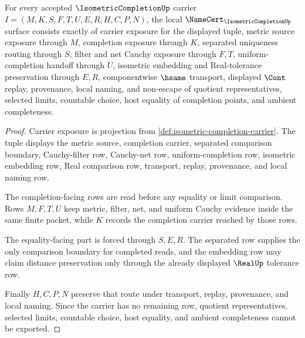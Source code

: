 \begin{theorem}
\label{thm:isometric-completion-namecert-obligations}
For every accepted $\IsometricCompletionUp$ carrier $I=(M,K,S,F,T,U,E,R,H,C,P,N)$, the local $\NameCert_{\IsometricCompletionUp}$ surface consists exactly of carrier exposure for the displayed tuple, metric source exposure through $M$, completion exposure through $K$, separated uniqueness routing through $S$, filter and net Cauchy exposure through $F,T$, uniform-completion handoff through $U$, isometric embedding and Real-tolerance preservation through $E,R$, componentwise $\hsame$ transport, displayed $\Cont$ replay, provenance, local naming, and non-escape of quotient representatives, selected limits, countable choice, host equality of completion points, and ambient completeness.
\end{theorem}
\begin{proof}
Carrier exposure is projection from \autoref{def:isometric-completion-carrier}. The tuple displays the metric source, completion carrier, separated comparison boundary, Cauchy-filter row, Cauchy-net row, uniform-completion row, isometric embedding row, Real comparison row, transport, replay, provenance, and local naming row.

The completion-facing rows are read before any equality or limit comparison. Rows $M,F,T,U$ keep metric, filter, net, and uniform Cauchy evidence inside the same finite packet, while $K$ records the completion carrier reached by those rows.

The equality-facing part is forced through $S,E,R$. The separated row supplies the only comparison boundary for completed reads, and the embedding row may claim distance preservation only through the already displayed $\RealUp$ tolerance row.

Finally $H,C,P,N$ preserve that route under transport, replay, provenance, and local naming. Since the carrier has no remaining row, quotient representatives, selected limits, countable choice, host equality, and ambient completeness cannot be exported.
\end{proof}

